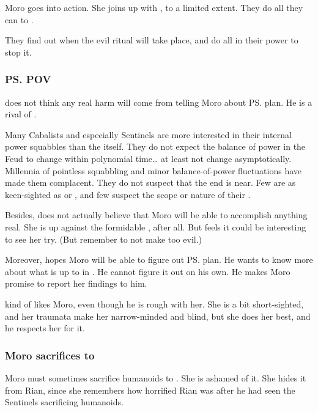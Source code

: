 Moro goes into action. 
She joins up with \Tiroco, to a limited extent. 
They do all they can to . 

They find out when the evil ritual will take place, and do all in their power to stop it. 





\subsubsection{\ps{\Nasshikerr} POV}
\Nasshikerr{} does not think any real harm will come from telling Moro about \ps{\Secherdamon} plan. 
He is a rival of \Secherdamon. 

Many Cabalists and especially Sentinels are more interested in their internal power squabbles than the  itself. 
They do not expect the balance of power in the Feud to change within polynomial time\ldots{} at least not change asymptotically. 
Millennia of pointless squabbling and minor balance-of-power fluctuations have made them complacent. 
They do not suspect that the end is near. 
Few are as keen-sighted as \Secherdamon{} or \Azraid, and few suspect the scope or nature of their . 

Besides, \Nasshikerr{} does not actually believe that Moro will be able to accomplish anything real. 
She is up against the formidable , after all. 
But \Nasshikerr{} feels it could be interesting to see her try. 
(But remember to not make \Nasshikerr{} too evil.) 

Moreover, \Nasshikerr{} hopes Moro will be able to figure out \ps{\Secherdamon} plan. 
He wants to know more about what \Secherdamon{} is up to in \Malcur. 
He cannot figure it out on his own. 
He makes Moro promise to report her findings to him. 

\Nasshikerr{} kind of likes Moro, even though he is rough with her. 
She is a bit short-sighted, and her traumata make her narrow-minded and blind, but she does her best, and he respects her for it. 





\subsubsection{Moro sacrifices to {\Nasshikerr}}
Moro must sometimes sacrifice humanoids to \Nasshikerr. 
She is ashamed of it. 
She hides it from Rian, since she remembers how horrified Rian was after he had seen the Sentinels sacrificing humanoids. 

